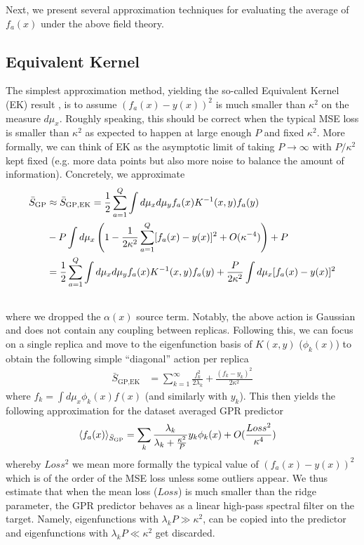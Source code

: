 Next, we present several approximation techniques for evaluating the average of $f_a(x)$ under the above field theory. 
\subsection{Equivalent Kernel}
\label{Sec:EK}
The simplest approximation method, yielding the so-called Equivalent Kernel (EK) result \citep{Silverman1984}, is to assume $(f_a(x)-y(x))^2$ is much smaller than $\kappa^2$ on the measure $d\mu_x$. Roughly speaking, this should be correct when the typical MSE loss is smaller than $\kappa^2$ as expected to happen at large enough $P$ and fixed $\kappa^2$. More formally, we can think of EK as the asymptotic limit of taking $P\rightarrow \infty$ with $P/\kappa^2$ kept fixed (e.g. more data points but also more noise to balance the amount of information). Concretely, we approximate 
\begin{align}
\label{Eq:Approx_S_GP}
\bar{S}_{\text{GP}} &\approx \bar{S}_{\text{GP},\text{EK}} = \frac{1}{2} \sum_{a=1}^Q \int d\mu_x d\mu_y f_a(x) K^{-1}(x,y) f_a(y) \\ \nonumber  &- P \int d\mu_x \left(1- \frac{1}{2\kappa^2}\sum_{a=1}^Q [f_a(x)-y(x)]^2 + O(\kappa^{-4})\right)  
+ P  \\ \nonumber 
&= \frac{1}{2} \sum_{a=1}^Q \int d\mu_x d\mu_y f_a(x) K^{-1}(x,y) f_a(y) +\frac{P}{2\kappa^2} \int d\mu_x [f_a(x)-y(x)]^2  \\ \nonumber 
\end{align}
where we dropped the $\alpha(x)$ source term. 
Notably, the above action is Gaussian and does not contain any coupling between replicas. Following this, we can focus on a single replica and move to the eigenfunction basis of $K(x,y)$ ($\phi_k(x)$) to obtain the following simple ``diagonal'' action per replica
\begin{align}
\label{Eq:EK_Av_Pred}
\bar{S}_{\text{GP,EK}}&= \sum_{k=1}^{\infty} \frac{f_k^2}{2 \lambda_k} + \frac{(f_k-y_k)^2}{2\kappa^2}
\end{align}
where $f_k = \int d\mu_x \phi_k(x) f(x)$ (and similarly with $y_k$). This then yields the following approximation for the dataset averaged GPR predictor 
\begin{align}
\langle f_a(x) \rangle_{\bar{S}_{\text{GP}}} &= \sum_k \frac{\lambda_k}{\lambda_k + \frac{\kappa^2}{P}} y_k \phi_k(x) + O(\frac{Loss^2}{\kappa^4})
\end{align}
whereby $Loss^2$ we mean more formally the typical value of $(f_a(x)-y(x))^2$ which is of the order of the MSE loss unless some outliers appear. We thus estimate that when the mean loss ($Loss$) is much smaller than the ridge parameter, the GPR predictor behaves as a linear high-pass spectral filter on the target. Namely, eigenfunctions with $\lambda_k P \gg \kappa^2$, can be copied into the predictor and eigenfunctions with $\lambda_k P \ll \kappa^2$ get discarded. 

